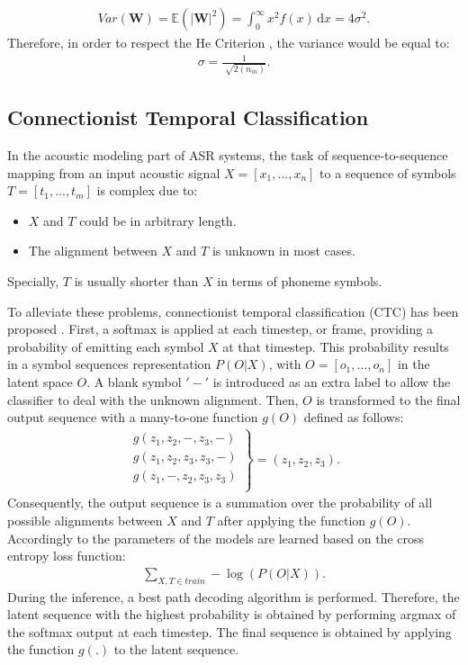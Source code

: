\documentclass[a4paper]{article}
\def\W{\textbf{W}}
\begin{document}
\begin{align}
	Var(\W) = \mathbb{E}(|\W|^2) =\int_{0}^{\infty} x^2f(x) \, \mathrm{d}x=4\sigma^2.
\end{align}
Therefore, in order to respect the He Criterion \cite{he2015delving}, the variance would be equal to:
\begin{align}
\sigma = \frac{1}{\sqrt[]{2(n_{in})}}.
\end{align}



\subsection{Connectionist Temporal Classification}
\label{subsec:ctc}
In the acoustic modeling part of ASR systems, the task of sequence-to-sequence mapping from an input acoustic signal $X=[x_1,...,x_n]$ to a sequence of symbols $T=[t_1,...,t_m]$ is complex due to:
\begin{itemize}
\item $X$ and $T$ could be in arbitrary length.
\item The alignment between $X$ and $T$ is unknown in most cases.
\end{itemize}
Specially, $T$ is usually shorter than $X$ in terms of phoneme symbols.

To alleviate these problems, connectionist temporal classification (CTC) has been proposed \cite{graves2006connectionist}. First, a softmax is applied at each timestep, or frame, providing a probability of emitting each symbol $X$ at that timestep. This probability results in a symbol sequences representation $P(O|X)$, with $O = [o_1,...,o_n]$ in the latent space $O$. A blank symbol $'-'$ is introduced as an extra label to allow the classifier to deal with the unknown alignment. Then, $O$ is transformed to the final output sequence with a many-to-one function $g(O)$ defined as follows:
\begin{align}
\left.
    \begin{array}{ll}
        g(z_1,z_2,-,z_3,-) \\
        g(z_1,z_2,z_3,z_3,-) \\
        g(z_1,-,z_2,z_3,z_3) \\
    \end{array}
\right \}=(z_1,z_2,z_3). 
\end{align}
Consequently, the output sequence is a summation over the probability of all possible alignments between $X$ and $T$ after applying the function $g(O)$. Accordingly to \cite{graves2006connectionist} the parameters of the models are learned based on the cross entropy loss function: 
\begin{align}
 \sum\nolimits_{X, T \in train}-\log(P(O|X)). 
\end{align}
During the inference, a best path decoding algorithm is performed. Therefore, the latent sequence with the highest probability is obtained by performing argmax of the softmax output at each timestep. The final sequence is obtained by applying the function $g(.)$ to the latent sequence. 
\end{document}

